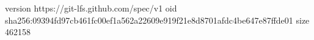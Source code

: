 version https://git-lfs.github.com/spec/v1
oid sha256:09394fd97cb461fc00ef1a562a22609e919f21e8d8701afdc4be647e87ffde01
size 462158
